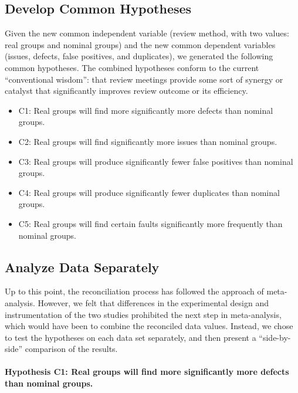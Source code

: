         
\subsection{Develop Common Hypotheses}

Given the new common independent variable (review method, with two 
values: real groups and nominal groups) and the new common dependent
variables (issues, defects, false positives, and duplicates), we generated
the following common hypotheses. The combined hypotheses conform
to the current ``conventional wisdom'': that review meetings provide some
sort of synergy or catalyst that significantly improves review outcome or its
efficiency.

\begin{itemize}

\item C1: Real groups will find more significantly more defects than nominal groups. 

\item C2: Real groups will find significantly more issues than nominal groups.
  
\item C3: Real groups will produce significantly fewer false positives than
  nominal groups.

\item C4: Real groups will produce significantly fewer duplicates than nominal groups. 

\item C5: Real groups will find certain faults significantly more frequently
      than nominal groups.

\end{itemize}


\subsection{ Analyze Data Separately}


Up to this point, the reconciliation process has followed the
approach of meta-analysis.   However, we felt that
differences in the experimental design and
instrumentation of the two studies prohibited the next
step in meta-analysis, which would have been to combine the
reconciled data values. Instead, we chose to test the
hypotheses on each data set separately, and then present 
a  ``side-by-side'' comparison of the results.


\paragraph{Hypothesis C1: Real groups will find more significantly more defects than nominal groups.}

